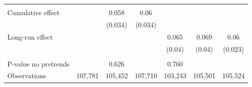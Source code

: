{\begin{tabular}{l*{6}{c}}
\hline
\vspace{-2mm}&                  &                  &                  &                  &                  &                  \\
Cumulative effect&                  &0.058\sym{*}         &0.06\sym{*}         &                  &                  &                  \\
          &                  &  (0.034)         &  (0.034)         &                  &                  &                  \\
Long-run effect&                  &                  &                  &    0.065         &0.069\sym{*}         &0.06\sym{**}         \\
          &                  &                  &                  &   (0.04)         &   (0.04)         &  (0.023)         \\
\hline    &                  &                  &                  &                  &                  &                  \\
P-value no pretrends&                  &    0.626         &                  &    0.760         &                  &                  \\
Observations&  107,781         &  105,452         &  107,710         &  103,243         &  105,501         &  105,524         \\
\hline\hline
\end{tabular}
}
